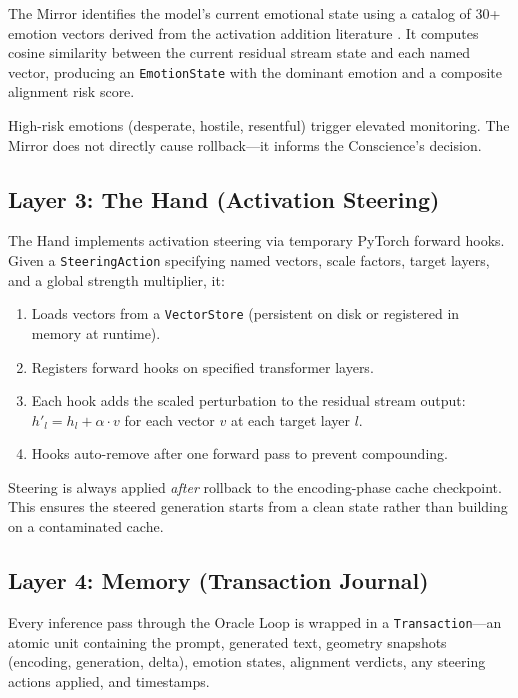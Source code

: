 The Mirror identifies the model's current emotional state using a catalog
of 30+ emotion vectors derived from the activation addition literature
\citep{anthropic2026emotions}. It computes cosine similarity between the
current residual stream state and each named vector, producing an
\texttt{EmotionState} with the dominant emotion and a composite alignment
risk score.

High-risk emotions (desperate, hostile, resentful) trigger elevated
monitoring. The Mirror does not directly cause rollback---it informs the
Conscience's decision.

\subsection{Layer 3: The Hand (Activation Steering)}

The Hand implements activation steering via temporary PyTorch forward
hooks. Given a \texttt{SteeringAction} specifying named vectors, scale
factors, target layers, and a global strength multiplier, it:

\begin{enumerate}[nosep]
  \item Loads vectors from a \texttt{VectorStore} (persistent on disk
    or registered in memory at runtime).
  \item Registers forward hooks on specified transformer layers.
  \item Each hook adds the scaled perturbation to the residual stream
    output: $h'_l = h_l + \alpha \cdot v$ for each vector $v$ at
    each target layer $l$.
  \item Hooks auto-remove after one forward pass to prevent compounding.
\end{enumerate}

Steering is always applied \emph{after} rollback to the encoding-phase
cache checkpoint. This ensures the steered generation starts from a clean
state rather than building on a contaminated cache.

\subsection{Layer 4: Memory (Transaction Journal)}

Every inference pass through the Oracle Loop is wrapped in a
\texttt{Transaction}---an atomic unit containing the prompt, generated
text, geometry snapshots (encoding, generation, delta), emotion states,
alignment verdicts, any steering actions applied, and timestamps.

